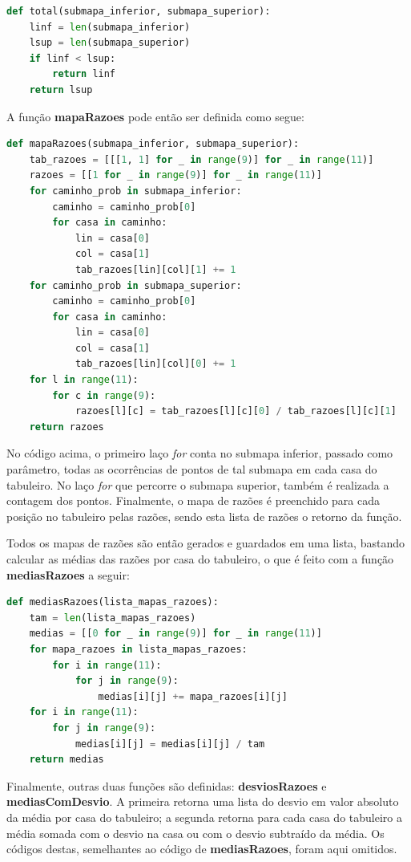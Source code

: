 \documentclass[12pt]{article}
\begin{document}
\begin{lstlisting}[language=Python]
def total(submapa_inferior, submapa_superior):
	linf = len(submapa_inferior)
	lsup = len(submapa_superior)
	if linf < lsup:
		return linf
	return lsup
\end{lstlisting}

A função \textbf{mapaRazoes} pode então ser definida como segue:

\begin{lstlisting}[language=Python]
def mapaRazoes(submapa_inferior, submapa_superior):
	tab_razoes = [[[1, 1] for _ in range(9)] for _ in range(11)] 
	razoes = [[1 for _ in range(9)] for _ in range(11)]
	for caminho_prob in submapa_inferior:
		caminho = caminho_prob[0]
		for casa in caminho:
			lin = casa[0]
			col = casa[1]
			tab_razoes[lin][col][1] += 1
	for caminho_prob in submapa_superior:
		caminho = caminho_prob[0]
		for casa in caminho:
			lin = casa[0]
			col = casa[1]
			tab_razoes[lin][col][0] += 1
	for l in range(11):
		for c in range(9):
			razoes[l][c] = tab_razoes[l][c][0] / tab_razoes[l][c][1]
	return razoes
\end{lstlisting}

No código acima, o primeiro laço \textit{for} conta no submapa inferior, passado como parâmetro, todas as ocorrências de pontos de tal submapa em cada casa do tabuleiro. No laço \textit{for} que percorre o submapa superior, também é realizada a contagem dos pontos. Finalmente, o mapa de razões é preenchido para cada posição no tabuleiro pelas razões, sendo esta lista de razões o retorno da função.

Todos os mapas de razões são então gerados e guardados em uma lista, bastando calcular as médias das razões por casa do tabuleiro, o que é feito com a função \textbf{mediasRazoes} a seguir:

\begin{lstlisting}[language=Python]
def mediasRazoes(lista_mapas_razoes):
	tam = len(lista_mapas_razoes)
	medias = [[0 for _ in range(9)] for _ in range(11)]
	for mapa_razoes in lista_mapas_razoes:
		for i in range(11):
			for j in range(9):
				medias[i][j] += mapa_razoes[i][j]
	for i in range(11):
		for j in range(9):
			medias[i][j] = medias[i][j] / tam
	return medias
\end{lstlisting}

Finalmente, outras duas funções são definidas: \textbf{desviosRazoes} e \textbf{mediasComDesvio}. A primeira retorna uma lista do desvio em valor absoluto da média por casa do tabuleiro; a segunda retorna para cada casa do tabuleiro a média somada com o desvio na casa ou com o desvio subtraído da média. Os códigos destas, semelhantes ao código de \textbf{mediasRazoes}, foram aqui omitidos.
\end{document}

